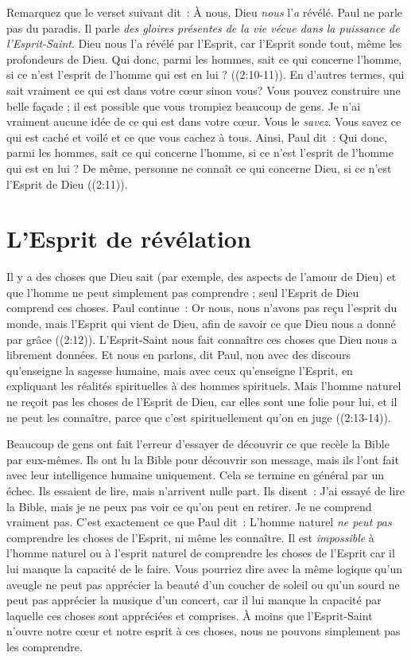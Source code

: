 Remarquez que le verset suivant dit~:
 \og À nous, Dieu \emph{nous} l'\emph{a} révélé. \fg{}
 Paul ne parle pas du paradis.
 Il parle \emph{des gloires présentes de la vie vécue dans la puissance
 de l'Esprit-Saint}.
 \og Dieu nous l'a révélé par l'Esprit, car l'Esprit sonde tout,
 même les profondeurs de Dieu. Qui donc, parmi les hommes,
 sait ce qui concerne l'homme, si ce n'est l'esprit de l'homme
 qui est en lui ? \fg{} ((2:10-11)).
 En d'autres termes, qui sait vraiment ce qui est dans votre cœur sinon vous?
 Vous pouvez construire une belle façade ; il est possible que vous trompiez
 beaucoup de gens.
 Je n'ai vraiment aucune idée de ce qui est dans votre cœur.
 Vous le \emph{savez}.
 Vous savez ce qui est caché et voilé et ce que vous cachez à tous.
 Ainsi, Paul dit~:
 \og Qui donc, parmi les hommes, sait ce qui concerne l'homme,
 si ce n'est l'esprit de l'homme qui est en lui ?
 De même, personne ne connaît ce qui concerne Dieu,
 si ce n'est l'Esprit de Dieu \fg{} ((2:11)).


\section*{L'Esprit de révélation}

Il y a des choses que Dieu sait
 (par exemple, des aspects de l'amour de Dieu)
 et que l'homme ne peut simplement pas comprendre ;
 seul l'Esprit de Dieu comprend ces choses. Paul continue~:
 \og Or nous, nous n'avons pas reçu l'esprit du monde,
 mais l'Esprit qui vient de Dieu, afin de savoir ce que Dieu
 nous a donné par grâce \fg{} ((2:12)).
 L'Esprit-Saint nous fait connaître ces choses que Dieu
 nous a librement données.
 \og Et nous en parlons, dit Paul, non avec des discours qu'enseigne
 la sagesse humaine, mais avec ceux qu'enseigne l'Esprit,
 en expliquant les réalités spirituelles à des hommes spirituels.
 Mais l'homme naturel ne reçoit pas les choses de l'Esprit de Dieu,
 car elles sont une folie pour lui, et il ne peut les connaître,
 parce que c'est spirituellement qu'on en juge \fg{}
 ((2:13-14)).

Beaucoup de gens ont fait l'erreur d'essayer de découvrir ce que recèle
 la Bible par eux-mêmes. Ils ont lu la Bible pour découvrir son message,
 mais ils l'ont fait avec leur intelligence humaine uniquement.
 Cela se termine en général par un échec. Ils essaient de lire,
 mais n'arrivent nulle part. Ils disent~:
 \og J'ai essayé de lire la Bible, mais je ne peux pas voir ce qu'on peut
 en retirer. Je ne comprend vraiment pas. \fg{}
 C'est exactement ce que Paul dit~:
 \og L'homme naturel \emph{ne peut pas} comprendre les choses de l'Esprit,
 ni même les connaître. \fg{}
 Il est \emph{impossible} à l'homme naturel ou à l'esprit naturel
 de comprendre les choses de l'Esprit car il lui manque la capacité
 de le faire. Vous pourriez dire avec la même logique qu'un aveugle
 ne peut pas apprécier la beauté d'un coucher de soleil ou qu'un sourd
 ne peut pas apprécier la musique d'un concert, car il lui manque la capacité
 par laquelle ces choses sont appréciées et comprises.
 À moins que l'Esprit-Saint n'ouvre notre cœur et notre esprit à ces choses,
 nous ne pouvons simplement pas les comprendre.


